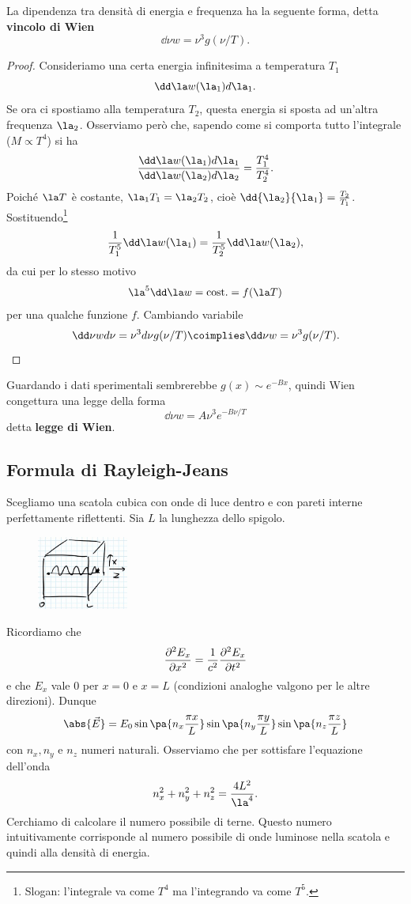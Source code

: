 \begin{proposition}\label{VincoloWien}
La dipendenza tra densit\`a di energia e frequenza ha la seguente forma, detta \textbf{vincolo di Wien}
\[\dd \nu w=\nu^3 g(\nu/T).\]
\end{proposition}
\begin{proof}
Consideriamo una certa energia infinitesima a temperatura $T_1$
\[\dd \la w(\la_1)d\la_1.\]
Se ora ci spostiamo alla temperatura $T_2$, questa energia si sposta ad un'altra frequenza $\la_2$. Osserviamo per\`o che, sapendo come si comporta tutto l'integrale ($M\propto T^4$) si ha
\[\frac{\dd \la w(\la_1)d\la_1}{\dd \la w(\la_2)d\la_2}=\frac{T^4_1}{T^4_2}.\]
Poich\'e $\la T$ \`e costante, $\la_1T_1=\la_2T_2$, cio\`e $\dd{\la_2}{\la_1}=\frac{T_2}{T_1}$. Sostituendo\footnote{Slogan: l'integrale va come $T^4$ ma l'integrando va come $T^5$.}
\[\frac1{T_1^5}\dd \la w(\la_1)=\frac1{T_2^5}\dd \la w(\la_2),\]
da cui per lo stesso motivo
\[\la^5\dd \la w=\text{cost.}=f(\la T)\]
per una qualche funzione $f$. Cambiando variabile
\[\dd \nu wd\nu=\nu^3d\nu g(\nu/T)\coimplies \dd \nu w=\nu^3 g(\nu/T).\]
\end{proof}

\noindent
Guardando i dati sperimentali sembrerebbe $g(x)\sim e^{-Bx}$, quindi Wien congettura una legge della forma
\[\dd \nu w=A\nu^3e^{-B\nu/T}\]
detta \textbf{legge di Wien}.




\subsection{Formula di Rayleigh-Jeans}
Scegliamo una scatola cubica con onde di luce dentro e con pareti interne perfettamente riflettenti. Sia $L$ la lunghezza dello spigolo.

\begin{figure}[!htb]
    \centering
    \includegraphics[width=3cm]{images/raggio_dentro_scatola.png}
\end{figure}


\noindent
Ricordiamo che
\[\pps[2]x{E_x}=\frac1{c^2}\pps[2]t{E_x}\]
e che $E_x$ vale $0$ per $x=0$ e $x=L$ (condizioni analoghe valgono per le altre direzioni). Dunque
\[\abs{\vec E}=E_0\sin\pa{n_x\frac{\pi x}L}\sin\pa{n_y\frac{\pi y}L}\sin\pa{n_z\frac{\pi z}L}\]
con $n_x,n_y$ e $n_z$ numeri naturali. Osserviamo che per sottisfare l'equazione dell'onda
\[n_x^2+n_y^2+n_z^2=\frac{4L^2}{\la^4}.\]
Cerchiamo di calcolare il numero possibile di terne. Questo numero intuitivamente corrisponde al numero possibile di onde luminose nella scatola e quindi alla densit\`a di energia.

